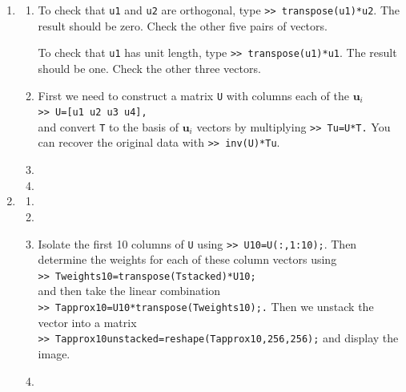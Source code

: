 \begin{sol}
\begin{enumerate}
    \item \begin{enumerate}
        \item To check that \texttt{u1} and \texttt{u2} are orthogonal, type \texttt{>> transpose(u1)*u2}. The result should be zero. Check the other five pairs of vectors.
        
        To check that \texttt{u1} has unit length, type \texttt{>> transpose(u1)*u1}. The result should be one. Check the other three vectors.
        
        \item First we need to construct a matrix \texttt{U} with columns each of the $\mathbf{u}_i$\\
        \texttt{>> U=[u1 u2 u3 u4],}\\
        and convert \texttt{T} to the basis of $\mathbf{u}_i$ vectors by multiplying
        \texttt{>> Tu=U*T.} You can recover the original data with \texttt{>> inv(U)*Tu}.
        
        \item 
        \item
    \end{enumerate}
    \item \begin{enumerate}
        \item 
        \item
        \item Isolate the first 10 columns of \texttt{U} using \texttt{>> U10=U(:,1:10);}. Then determine the weights for each of these column vectors using\\
        \texttt{>> Tweights10=transpose(Tstacked)*U10;}\\
        and then take the linear combination\\
        \texttt{>> Tapprox10=U10*transpose(Tweights10);.}
        Then we unstack the vector into a matrix\\
        \texttt{>> Tapprox10unstacked=reshape(Tapprox10,256,256);}
        and display the image.
        \item 
    \end{enumerate}
\end{enumerate}
\end{sol}


